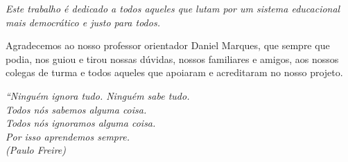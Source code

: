 \documentclass[
    12pt,               %
    openright,          %
    oneside,
    a4paper,            %
    english,            %
    brazil              %
    ]{ifsp-spo-inf-ctds} %
\begin{document}
\pretextual

\imprimircapa

\imprimirfolhaderosto

\begin{dedicatoria}
   \vspace*{\fill}
   \centering
   \noindent
   \textit{ Este trabalho é dedicado a todos aqueles que lutam por um sistema educacional mais democrático e justo para todos.} 

   
   \vspace*{\fill}
   
\end{dedicatoria}

\begin{agradecimentos}
Agradecemos ao nosso professor orientador Daniel Marques, que sempre que podia, nos guiou e tirou nossas dúvidas, nossos familiares e amigos, aos nossos colegas de turma e todos aqueles que apoiaram e acreditaram no nosso projeto.


\end{agradecimentos}

\begin{epigrafe}
    \vspace*{\fill}
    \begin{flushright}
        \textit{``Ninguém ignora tudo. Ninguém sabe tudo. \\
        Todos nós sabemos alguma coisa. \\
        Todos nós ignoramos alguma coisa.\\
        Por isso aprendemos sempre. \\
        (Paulo Freire)}
    \end{flushright}
\end{epigrafe}
\end{document}
